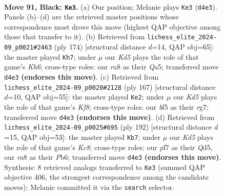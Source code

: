 \documentclass[11pt]{article}
\begin{document}
\clearpage

\begin{figure}[p]\centering
\begin{subfigure}{0.46\textwidth}\centering
\resizebox{\linewidth}{!}{%
\newchessgame
\chessboard[
  setfen={R6Q/5P2/8/5B2/3k4/8/8/7K b - - 0 91},
  showmover=false,
  pgfstyle=straightmove, color=movearrow, markmove={d4-e3}
]}
\caption{}
\end{subfigure}\hfill
\begin{subfigure}{0.46\textwidth}\centering
\resizebox{\linewidth}{!}{%
\newchessgame
\chessboard[
  setfen={8/4k3/3q3K/Q7/8/1p6/8/8 w - - 52 88},
  showmover=false,
  pgfstyle=straightmove, color=movearrow, markmove={h6-h7}
]}
\caption{}
\end{subfigure}
\\[4pt]
\begin{subfigure}{0.46\textwidth}\centering
\resizebox{\linewidth}{!}{%
\newchessgame
\chessboard[
  setfen={8/6R1/5Q2/6K1/8/8/8/5k2 b - - 8 84},
  showmover=false,
  pgfstyle=straightmove, color=movearrow, markmove={f1-e2}
]}
\caption{}
\end{subfigure}\hfill
\begin{subfigure}{0.46\textwidth}\centering
\resizebox{\linewidth}{!}{%
\newchessgame
\chessboard[
  setfen={2K5/8/1P6/3Q4/8/6kq/8/8 w - - 45 97},
  showmover=false,
  pgfstyle=straightmove, color=movearrow, markmove={c8-b7}
]}
\caption{}
\end{subfigure}
\caption{\textbf{Move 91, Black: \texttt{Ke3}.} (a) Our position; Melanie plays \texttt{Ke3} (\texttt{d4e3}). Panels (b)--(d) are the retrieved master positions whose correspondence most drove this move (highest QAP objective among those that transfer to it). (b) Retrieved from \texttt{lichess\_elite\_2024-09\_p0021\#2463} (ply 174) [structural distance $d$=14, QAP obj=65]: the master played \texttt{Kh7}; under $\mu$ our \emph{Kd5} plays the role of that game's \emph{Kh6}; cross-type roles: our \emph{r}a8 as their \emph{Q}a5; transferred move \texttt{d4e3} \textbf{(endorses this move)}. (c) Retrieved from \texttt{lichess\_elite\_2024-09\_p0020\#2128} (ply 167) [structural distance $d$=10, QAP obj=55]: the master played \texttt{Ke2}; under $\mu$ our \emph{Kd5} plays the role of that game's \emph{Kf8}; cross-type roles: our \emph{b}f5 as their \emph{r}g7; transferred move \texttt{d4e3} \textbf{(endorses this move)}. (d) Retrieved from \texttt{lichess\_elite\_2024-09\_p0025\#695} (ply 192) [structural distance $d$=15, QAP obj=53]: the master played \texttt{Kb7}; under $\mu$ our \emph{Kd5} plays the role of that game's \emph{Kc8}; cross-type roles: our \emph{p}f7 as their \emph{Q}d5, our \emph{r}a8 as their \emph{P}b6; transferred move \texttt{d4e3} \textbf{(endorses this move)}. Synthesis: 8 retrieved analogs transferred to \texttt{Ke3} (summed QAP objective 406, the strongest correspondence among the candidate moves); Melanie committed it via the \texttt{search} selector.}
\label{fig:thought-m181}
\end{figure}
\end{document}
